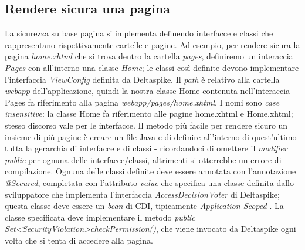 \subsection{Rendere sicura una pagina} 
La sicurezza su base pagina si implementa definendo interfacce e classi che rappresentano rispettivamente cartelle e pagine. Ad esempio, per rendere sicura la pagina \textsl{home.xhtml} che si trova dentro la cartella \textsl{pages}, definiremo un interaccia \textsl{Pages} con all'interno una classe \textsl{Home}; le classi così definite devono implementare l'interfaccia \textsl{ViewConfig} definita da Deltaspike. Il \textit{path} è relativo alla cartella \textsl{webapp} dell'applicazione, quindi la nostra classe Home contenuta nell'interaccia Pages fa riferimento alla pagina \textsl{webapp/pages/home.xhtml}. I nomi sono \textit{case insensitive}: la classe Home fa riferimento alle pagine home.xhtml e Home.xhtml; stesso discorso vale per le interfacce.\newline
Il metodo più facile per rendere sicuro un insieme di più pagine è creare un file Java e di definire all'interno di quest'ultimo tutta la gerarchia di interfacce e di classi - ricordandoci di omettere il \textit{modifier} \textsl{public} per ognuna delle interfacce/classi, altrimenti si otterrebbe un errore di compilazione.\newline
Ognuna delle classi definite deve essere annotata con l'annotazione \textsl{@Secured}, completata con l'attributo \textsl{value} che specifica una classe definita dallo sviluppatore che implementa l'interfaccia \textsl{AccessDecisionVoter} di Deltaspike; questa classe deve essere un \textit{bean} di CDI, tipicamente \textsl{Application Scoped} .
La classe specificata deve implementare il metodo \textsl{public Set\textless SecurityViolation\textgreater \space checkPermission()}, che viene invocato da Deltaspike ogni volta che si tenta di accedere alla pagina.\newline
